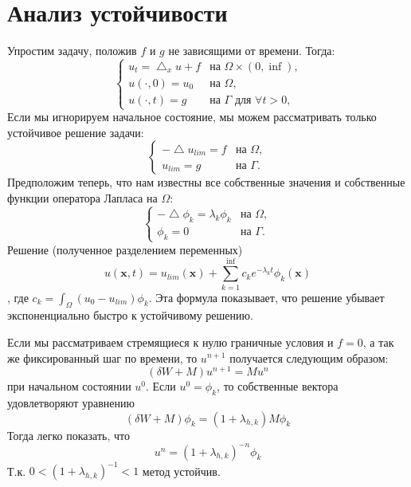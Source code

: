 \documentclass[paper=a4, fontsize=13pt]{scrartcl} %
\numberwithin{equation}{section} %
\numberwithin{figure}{section} %
\numberwithin{table}{section} %
\begin{document}
\section{Анализ устойчивости}
Упростим задачу, положив $f$ и $g$ не зависящими от времени. Тогда:
    \[
        \begin{cases}
            u_t = \bigtriangleup_x u + f& \text{на $\Omega \times (0, \inf)$,} \\
            u(\cdot, 0) = u_0& \text{на $\Omega$}, \\
            u(\cdot, t) = g& \text{на $\Gamma$ для $\forall t > 0$,}
        \end{cases}
    \]
Если мы игнорируем начальное состояние, мы можем рассматривать только устойчивое решение задачи:
    \[
        \begin{cases}
            -\bigtriangleup u_{lim} = f& \text{на $\Omega$}, \\
            u_{lim} = g& \text{на $\Gamma$.}
        \end{cases}
    \]
Предположим теперь, что нам известны все собственные значения и собственные функции оператора Лапласа на $\Omega$:
    \[
        \begin{cases}
            -\bigtriangleup \phi_k = \lambda_k \phi_k& \text{на $\Omega$}, \\
            \phi_k = 0& \text{на $\Gamma$.}
        \end{cases}
    \]
Решение (полученное разделением переменных) $$u(\bm{x}, t) = u_{lim}(\bm{x}) + \sum_{k=1}^{\inf} c_k e^{-\lambda_k t} \phi_k(\bm{x})$$, где $c_k = \int _\Omega (u_0 - u_{lim}) \phi_k$. Эта формула показывает, что решение убывает экспоненциально быстро к устойчивому решению.

Если мы рассматриваем стремящиеся к нулю граничные условия и $f = 0$, а так же фиксированный шаг по времени, то $u^{n+1}$ получается следующим образом: $$(\delta W + M) u^{n+1} = M u^n$$ при начальном состоянии $u^0$. Если $u^0 = \phi_k$, то собственные вектора удовлетворяют уравнению $$(\delta W + M) \phi_k = (1 + \lambda_{h, k}) M \phi_k$$ Тогда легко показать, что $$u^n = (1 + \lambda_{h, k})^{-n} \phi_k$$ Т.к. $0 < (1 + \lambda_{h, k})^{-1} < 1$ метод устойчив.
\end{document}
